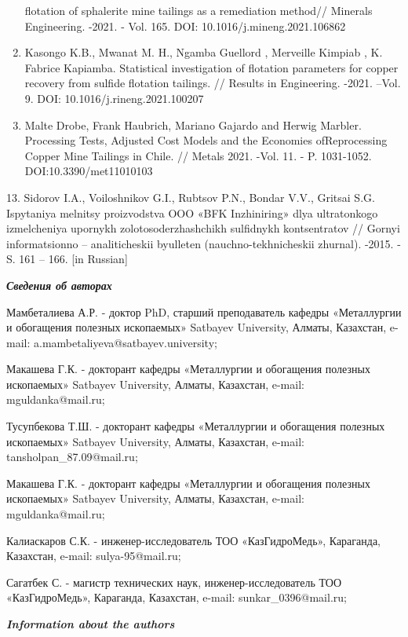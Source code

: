 \begin{enumerate}
  flotation of sphalerite mine tailings as a remediation method//
  Minerals Engineering. -2021. - Vol. 165. DOI:
  10.1016/j.mineng.2021.106862
\item
  Kasongo K.B., Mwanat M. H., Ngamba Guellord , Merveille Kimpiab , K.
  Fabrice Kapiamba. Statistical investigation of flotation parameters
  for copper recovery from sulfide flotation tailings. // Results in
  Engineering. -2021. --Vol. 9. DOI: 10.1016/j.rineng.2021.100207
\item
  Malte Drobe, Frank Haubrich, Mariano Gajardo and Herwig Marbler.
  Processing Tests, Adjusted Cost Models and the Economies
  ofReprocessing Copper Mine Tailings in Chile. // Metals 2021. -Vol.
  11. - P. 1031-1052. DOI:10.3390/met11010103
\end{enumerate}

13. Sidorov I.A., Voiloshnikov G.I., Rubtsov P.N.,
Bondar\textquotesingle{} V.V., Gritsai S.G. Ispytaniya
mel\textquotesingle nitsy proizvodstva OOO «BFK Inzhiniring» dlya
ul\textquotesingle tratonkogo izmel\textquotesingle cheniya upornykh
zolotosoderzhashchikh sul\textquotesingle fidnykh kontsentratov //
Gornyi informatsionno -- analiticheskii byulleten\textquotesingle{}
(nauchno-tekhnicheskii zhurnal). -2015. - S. 161 -- 166. {[}in
Russian{]}

\emph{{\bfseries Сведения об авторах}}

Мамбеталиева А.Р. - доктор PhD, старший преподаватель кафедры
«Металлургии и обогащения полезных ископаемых» Satbayev University,
Алматы, Казахстан, e-mail: a.mambetaliyeva@satbayev.university;

Макашева Г.К. - докторант кафедры «Металлургии и обогащения полезных
ископаемых» Satbayev University, Алматы, Казахстан, e-mail:
mguldanka@mail.ru;

Тусупбекова Т.Ш. - докторант кафедры «Металлургии и обогащения полезных
ископаемых» Satbayev University, Алматы, Казахстан, e-mail:
tansholpan\_87.09@mail.ru;

Макашева Г.К. - докторант кафедры «Металлургии и обогащения полезных
ископаемых» Satbayev University, Алматы, Казахстан, e-mail:
mguldanka@mail.ru;

Калиаскаров С.К. - инженер-исследователь ТОО «КазГидроМедь», Караганда,
Казахстан, e-mail: sulya-95@mail.ru;

Сагатбек С. - магистр технических наук, инженер-исследователь ТОО
«КазГидроМедь», Караганда, Казахстан, e-mail: sunkar\_0396@mail.ru;

\emph{{\bfseries Information about the authors}}

